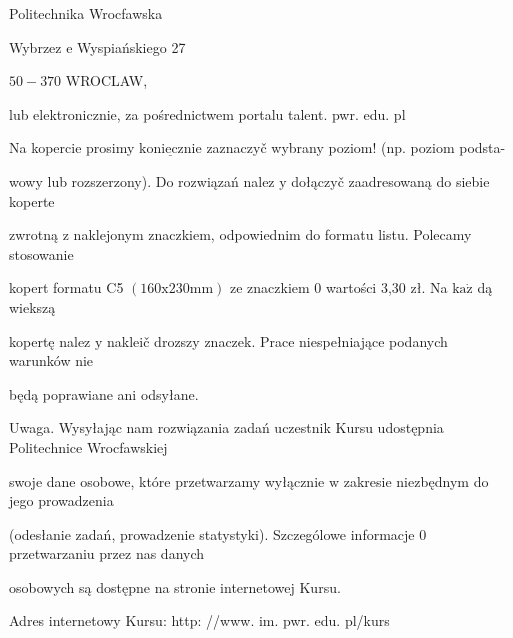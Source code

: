 \documentclass[a4paper,12pt]{article}
\begin{document}
Politechnika Wrocfawska

Wybrzez $\mathrm{e}$ Wyspiańskiego 27

$50-370$ WROCLAW,

lub elektronicznie, za pośrednictwem portalu talent. pwr. edu. pl

Na kopercie prosimy $\underline{\mathrm{k}\mathrm{o}\mathrm{n}\mathrm{i}\mathrm{e}\mathrm{c}\mathrm{z}\mathrm{n}\mathrm{i}\mathrm{e}}$ zaznaczyč wybrany poziom! (np. poziom podsta-

wowy lub rozszerzony). Do rozwiązań nalez $\mathrm{y}$ dołączyč zaadresowaną do siebie koperte

zwrotną $\mathrm{z}$ naklejonym znaczkiem, odpowiednim do formatu listu. Polecamy stosowanie

kopert formatu C5 $(160\mathrm{x}230\mathrm{m}\mathrm{m})$ ze znaczkiem $0$ wartości 3,30 zł. Na $\mathrm{k}\mathrm{a}\dot{\mathrm{z}}$ dą wiekszą

kopertę nalez $\mathrm{y}$ nakleič drozszy znaczek. Prace niespełniające podanych warunków nie

będą poprawiane ani odsyłane.

Uwaga. Wysyłając nam rozwiązania zadań uczestnik Kursu udostępnia Politechnice Wrocfawskiej

swoje dane osobowe, które przetwarzamy wyłącznie $\mathrm{w}$ zakresie niezbędnym do jego prowadzenia

(odesłanie zadań, prowadzenie statystyki). Szczególowe informacje $0$ przetwarzaniu przez nas danych

osobowych są dostępne na stronie internetowej Kursu.

Adres internetowy Kursu: http: //www. im. pwr. edu. pl/kurs
\end{document}
